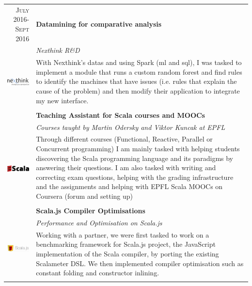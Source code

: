 \documentclass[a4paper,11pt]{article} %
\begin{document}
\begin{tabularx}{\textwidth}{r|X}

\textsc{July 2016-Sept 2016} & \textbf{Datamining for comparative analysis}\\
\multirow{4}{*}{ \includegraphics[width=60pt]{img/nexthinkLogo.png}}
& \emph{Nexthink R\&D}\\
& \footnotesize{With Nexthink's datas and using Spark (ml and sql), I was tasked to implement a module that runs a custom random forest and find rules to identify the machines that have issues (i.e. rules that explain the cause of the problem) and then modify their application to integrate my new interface.}\\
\multicolumn{2}{c}{} \\


\textsc{Feb 2015-Current} & \textbf{Teaching Assistant for Scala courses and MOOCs} \\
\multirow{4}{*}{ \includegraphics[width=60pt]{img/Scala.eps}}
& \emph{Courses taught by Martin Odersky and Viktor Kuncak at EPFL}\\ 
& \footnotesize{Through different courses (Functional, Reactive, Parallel or Concurrent programming) I am mainly tasked with helping students discovering the Scala programming language and its paradigms by answering their questions. I am also tasked with writing and correcting exam questions, helping with the grading infrastructure and the assignments and helping with EPFL Scala MOOCs on Coursera (forum and setting up) }\\
\multicolumn{2}{c}{} \\


\textsc{Sept 2015-Jan 2016} & \textbf{Scala.js Compiler Optimisations} \\
\multirow{4}{*}{ \includegraphics[width=60pt]{img/scalajs.png}}
& \emph{Performance and Optimisation on Scala.js}\\ 
& \footnotesize{Working with a partner, we were first tasked to work on a
benchmarking framework for Scala.js project, the JavaScript implementation of
the Scala compiler, by porting the existing Scalameter DSL.
We then implemented compiler optimisation such as constant folding and
constructor inlining.}\\
\multicolumn{2}{c}{} \\


\end{tabularx}
\end{document}
